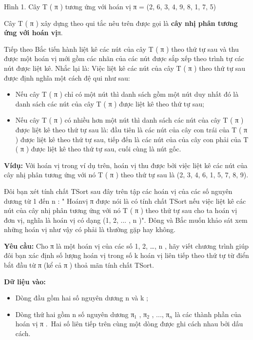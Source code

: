 Hình 1. Cây T ( π ) tương ứng với hoán vị π = (2, 6, 3, 4, 9, 8, 1, 7, 5)

Cây T ( π ) xây dựng theo qui tắc nêu trên được gọi là \textbf{cây nhị phân tương ứng với hoán vị}π.

Tiếp theo Bắc tiến hành liệt kê các nút của cây T ( π ) theo thứ tự sau và thu được một hoán vị mới gồm các nhãn của các nút được sắp xếp theo trình tự các nút được liệt kê. Nhắc lại là: Việc liệt kê các nút của cây T ( π ) theo thứ tự sau được định nghĩa một cách đệ qui như sau:
\begin{itemize}
	\item Nếu cây T ( π ) chỉ có một nút thì danh sách gồm một nút duy nhất đó là danh sách các nút của cây T ( π ) được liệt kê theo thứ tự sau;
	\item Nếu cây T ( π ) có nhiều hơn một nút thì danh sách các nút của cây T ( π ) được liệt kê theo thứ tự sau là: đầu tiên là các nút của cây con trái của T ( π ) được liệt kê theo thứ tự sau, tiếp đến là các nút của của cây con phải của T ( π ) được liệt kê theo thứ tự sau, cuối cùng là nút gốc.
\end{itemize}

\textbf{Ví}\textbf{}\textbf{dụ:} Với hoán vị trong ví dụ trên, hoán vị thu được bởi việc liệt kê các nút của cây nhị phân tương ứng với nó T ( π ) theo thứ tự sau là (2, 3, 4, 6, 1, 5, 7, 8, 9).

Đôi bạn xét tính chất TSort sau đây trên tập các hoán vị của các số nguyên dương từ 1 đến n : " Hoánvị π được nói là có tính chất TSort nếu việc liệt kê các nút của cây nhị phân tương ứng với nó T ( π ) theo thứ tự sau cho ta hoán vị đơn vị, nghĩa là hoán vị có dạng (1, 2, ... , n )". Đông và Bắc muốn khảo sát xem những hoán vị như vậy có phải là thường gặp hay không.

\textbf{Yêu }\textbf{}\textbf{ cầu: }\textbf{} Cho π là một hoán vị của các số 1, 2, …, n , hãy viết chương trình giúp đôi bạn xác định số lượng hoán vị trong số k hoán vị liên tiếp theo thứ tự từ điển bắt đầu từ π (kể cả π ) thoả mãn tính chất TSort.

\textbf{Dữ liệu vào: }
\begin{itemize}
	\item Dòng đầu gồm hai số nguyên dương n và k ;
	\item Dòng thứ hai gồm n số nguyên dương π$_ 1 $ , π$_ 2 $ , ..., π$_ n $ là các thành phần của hoán vị π . Hai số liên tiếp trên cùng một dòng được ghi cách nhau bởi dấu cách.
\end{itemize}

